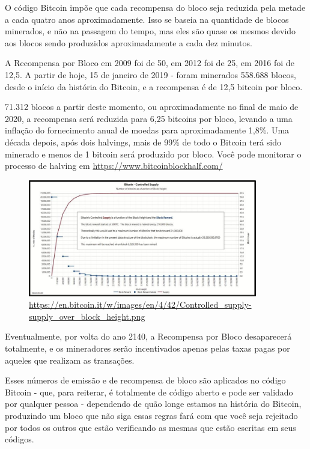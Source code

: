 O código Bitcoin impõe que cada recompensa do bloco seja reduzida pela metade a cada quatro anos aproximadamente. Isso se baseia na quantidade de blocos minerados, e não na passagem do tempo, mas eles são quase os mesmos devido aos blocos sendo produzidos aproximadamente a cada dez minutos.

A Recompensa por Bloco em 2009 foi de 50, em 2012 foi de 25, em 2016 foi de 12,5. A partir de hoje, 15 de janeiro de 2019 - foram minerados 558.688 blocos, desde o início da história do Bitcoin, e a recompensa é de 12,5 bitcoin por bloco.

71.312 blocos a partir deste momento, ou aproximadamente no final de maio de 2020, a recompensa será reduzida para 6,25 bitcoins por bloco, levando a uma inflação do fornecimento anual de moedas para aproximadamente 1,8\%. Uma década depois, após dois halvings, mais de 99\% de todo o Bitcoin terá sido minerado e menos de 1 bitcoin será produzido por bloco. Você pode monitorar o processo de halving em \url{https://www.bitcoinblockhalf.com/}

\begin{figure}[htb]
  \centering
  \includegraphics[width=10cm]{imagens/grafico-capitulo-05.jpg}
  \caption*{\url{https://en.bitcoin.it/w/images/en/4/42/Controlled_supply-supply_over_block_height.png}}
\end{figure}

Eventualmente, por volta do ano 2140, a Recompensa por Bloco desaparecerá totalmente, e os mineradores serão incentivados apenas pelas taxas pagas por aqueles que realizam as transações.

Esses números de emissão e de recompensa de bloco são aplicados no código Bitcoin - que, para reiterar, é totalmente de código aberto e pode ser validado por qualquer pessoa - dependendo de quão longe estamos na história do Bitcoin, produzindo um bloco que não siga essas regras fará com que você seja rejeitado por todos os outros que estão verificando as mesmas que estão escritas em seus códigos.

